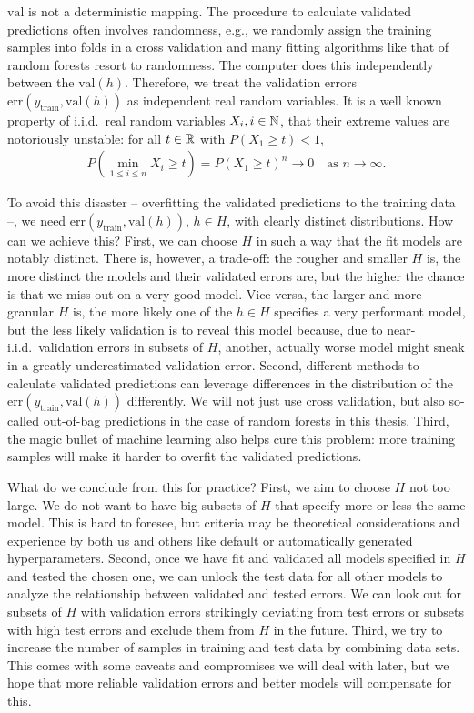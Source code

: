 $\text{val}$ is not a deterministic mapping. The procedure to calculate validated predictions often 
involves randomness, e.g., we randomly assign the training samples into folds in a cross validation 
and many fitting algorithms like that of random forests resort to randomness. The computer does this 
independently between the $\text{val}(h)$. Therefore, we treat the validation errors
$\text{err}(y_\text{train}, \text{val}(h))$ as independent 
real random variables. It is a well known property of i.i.d.\
real random variables $X_i, i \in \mathbb{N}$, that their extreme values are notoriously unstable: for all 
$t \in \mathbb{R}$ with $P(X_1 \geq t) < 1$, 
\begin{align}
    P\left( \min_{1 \leq i \leq n} X_i \geq t \right) = P(X_1 \geq t)^n \to 0 \quad
    \text{as } n \to \infty.
\end{align}

To avoid this disaster -- overfitting the validated predictions to the training 
data --, we need $\text{err}(y_\text{train}, \text{val}(h))$, $h \in H$, with clearly distinct 
distributions. 
How can we achieve this? First, we can choose $H$ in such a way that the fit models are 
notably distinct. There is, however, a trade-off: the rougher and smaller $H$ is, the more distinct 
the models and their validated errors are, but the higher the chance is that we miss out on a very good 
model. Vice versa, the larger and more granular $H$ is, the more likely one of the $h \in H$ 
specifies a very performant model, but the less likely validation is to reveal this model because,
due to near-i.i.d.\ validation errors in subsets of $H$, another, actually worse model might sneak 
in a greatly underestimated validation error. Second, different methods to calculate validated
predictions can leverage differences in the distribution of the 
$\text{err}(y_\text{train}, \text{val}(h))$ differently. We will not just use cross validation, but 
also so-called out-of-bag predictions in the case of random forests in this thesis. Third, the 
magic bullet of machine learning also helps cure this problem: more training samples will make it 
harder to overfit the validated predictions.

What do we conclude from this for practice? First, we aim to choose $H$ not too large.
We do not want to have big subsets of $H$ that specify more or less the same model. This is hard 
to foresee, but criteria may be theoretical considerations and experience by both us and others 
like default or automatically generated hyperparameters. Second, once we have fit and validated 
all models specified in $H$ and tested the chosen one, we can unlock the test data for all other 
models to analyze the relationship between validated and tested errors. We can look out for subsets 
of $H$ with validation errors strikingly deviating from test errors or subsets with high test errors and 
exclude them from $H$ in the future. Third, we try to increase the number of samples in training 
and test data by combining data sets. This comes with some caveats and compromises we will deal with 
later, but we hope that more reliable validation errors and better models will compensate for this.

